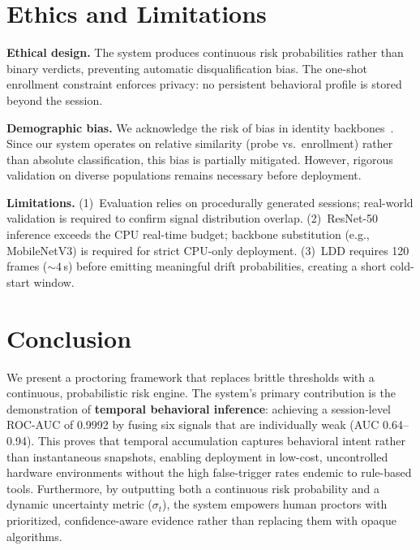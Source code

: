 \documentclass[conference]{IEEEtran}
\begin{document}
\section{Ethics and Limitations}

\textbf{Ethical design.} The system produces continuous risk probabilities rather than binary verdicts, preventing automatic disqualification bias. The one-shot enrollment constraint enforces privacy: no persistent behavioral profile is stored beyond the session.

\textbf{Demographic bias.} We acknowledge the risk of bias in identity backbones~\cite{Buolamwini2018}. Since our system operates on relative similarity (probe vs.\ enrollment) rather than absolute classification, this bias is partially mitigated. However, rigorous validation on diverse populations remains necessary before deployment.

\textbf{Limitations.} (1)~Evaluation relies on procedurally generated sessions; real-world validation is required to confirm signal distribution overlap. (2)~ResNet-50 inference exceeds the CPU real-time budget; backbone substitution (e.g., MobileNetV3) is required for strict CPU-only deployment. (3)~LDD requires 120 frames (${\sim}4$\,s) before emitting meaningful drift probabilities, creating a short cold-start window.

\section{Conclusion}

We present a proctoring framework that replaces brittle thresholds with a continuous, probabilistic risk engine. The system's primary contribution is the demonstration of \textbf{temporal behavioral inference}: achieving a session-level ROC-AUC of 0.9992 by fusing six signals that are individually weak (AUC 0.64--0.94). This proves that temporal accumulation captures behavioral intent rather than instantaneous snapshots, enabling deployment in low-cost, uncontrolled hardware environments without the high false-trigger rates endemic to rule-based tools. Furthermore, by outputting both a continuous risk probability and a dynamic uncertainty metric ($\sigma_t$), the system empowers human proctors with prioritized, confidence-aware evidence rather than replacing them with opaque algorithms.
\end{document}
